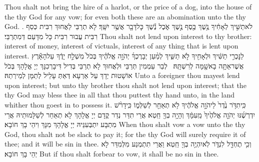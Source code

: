 {Thou shalt not bring the hire of a harlot, or the price of a dog, into the house of the \lord\space thy God for any vow; for even both these are an abomination unto the \lord\space thy God. .}{}
{לֹא\maqqaf תַשִּׁ֣יךְ לְאָחִ֔יךָ נֶ֥שֶׁךְ כֶּ֖סֶף נֶ֣שֶׁךְ אֹ֑כֶל נֶ֕שֶׁךְ כׇּל\maqqaf דָּבָ֖ר אֲשֶׁ֥ר יִשָּֽׁךְ׃}
{לָא תְרַבֵּי לַאֲחוּךְ רִבִּית כְּסַף רִבִּית עֲבוּר רִבִּית כָּל מִדָּעַם דְּמִתְרַבֵּי׃}
{Thou shalt not lend upon interest to thy brother: interest of money, interest of victuals, interest of any thing that is lent upon interest.}{}
{לַנׇּכְרִ֣י תַשִּׁ֔יךְ וּלְאָחִ֖יךָ לֹ֣א תַשִּׁ֑יךְ לְמַ֨עַן יְבָרֶכְךָ֜ יְהֹוָ֣ה אֱלֹהֶ֗יךָ בְּכֹל֙ מִשְׁלַ֣ח יָדֶ֔ךָ עַל\maqqaf הָאָ֕רֶץ אֲשֶׁר\maqqaf אַתָּ֥ה בָא\maqqaf שָׁ֖מָּה לְרִשְׁתָּֽהּ׃ \setuma }
{לְבַר עַמְמִין תְּרַבֵּי וּלְאֲחוּךְ לָא תְרַבֵּי בְּדִיל דִּיבָרְכִנָּךְ יְיָ אֱלָהָךְ בְּכֹל אוֹשָׁטוּת יְדָךְ עַל אַרְעָא דְּאַתְּ עָלֵיל לְתַמָּן לְמֵירְתַהּ׃}
{Unto a foreigner thou mayest lend upon interest; but unto thy brother thou shalt not lend upon interest; that the \lord\space thy God may bless thee in all that thou puttest thy hand unto, in the land whither thou goest in to possess it.}{}
\newseder
{}%
{כִּֽי\maqqaf תִדֹּ֥ר נֶ֙דֶר֙ לַיהֹוָ֣ה אֱלֹהֶ֔יךָ לֹ֥א תְאַחֵ֖ר לְשַׁלְּמ֑וֹ כִּֽי\maqqaf דָרֹ֨שׁ יִדְרְשֶׁ֜נּוּ יְהֹוָ֤ה אֱלֹהֶ֙יךָ֙ מֵֽעִמָּ֔ךְ וְהָיָ֥ה בְךָ֖ חֵֽטְא׃}
{אֲרֵי תִדַּר נְדַר קֳדָם יְיָ אֱלָהָךְ לָא תְאַחַר לְשַׁלָּמוּתֵיהּ אֲרֵי מִתְבָּע יִתְבְּעִנֵּיהּ יְיָ אֱלָהָךְ מִנָּךְ וִיהֵי בָךְ חוֹבָא׃}
{When thou shalt vow a vow unto the \lord\space thy God, thou shalt not be slack to pay it; for the \lord\space thy God will surely require it of thee; and it will be sin in thee.}{}
{וְכִ֥י תֶחְדַּ֖ל לִנְדֹּ֑ר לֹֽא\maqqaf יִהְיֶ֥ה בְךָ֖ חֵֽטְא׃}
{וַאֲרֵי תִתְמְנַע מִלְּמִדַּר לָא יְהֵי בָךְ חוֹבָא׃}
{But if thou shalt forbear to vow, it shall be no sin in thee.}{}
